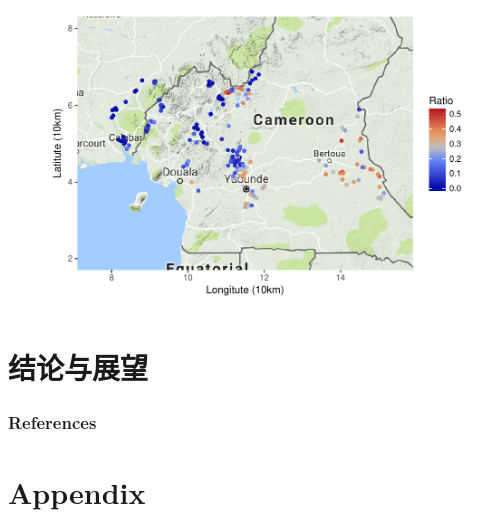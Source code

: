\documentclass[9pt,compress,xcolor=x11names,UTF8]{beamer}
\begin{document}
\begin{frame}
\begin{figure}
\centering
\includegraphics[width=\textwidth]{demo03} %
\end{figure}
\end{frame}



\section{结论与展望}

\begin{frame}

\end{frame}



\begin{frame}[allowframebreaks]
\frametitle{References}
\scriptsize


\end{frame}

\appendix

\section*{Appendix}
\end{document}

